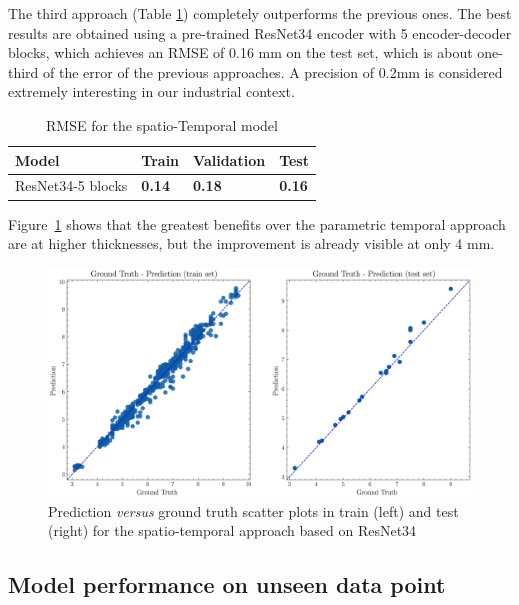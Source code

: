 The third approach (Table \ref{tab:spatial_temporal_model_results}) completely outperforms the previous ones. The best results are obtained using a pre-trained ResNet34 encoder with 5 encoder-decoder blocks, which achieves an RMSE of 0.16 mm on the test set, which is about one-third of the error of the previous approaches. A precision of 0.2mm is considered extremely interesting in our industrial context. 
\begin{table}
    \centering
    \caption{RMSE for the spatio-Temporal model}
    \begin{tabular}{llll}
    \toprule
    \textbf{Model} & \textbf{Train}  & \textbf{Validation}  & \textbf{Test}  \\
    \midrule
    ResNet34-5 blocks & \textbf{0.14} & \textbf{0.18} & \textbf{0.16} \\
    \bottomrule
    \end{tabular}
    \label{tab:spatial_temporal_model_results}
\end{table}
Figure~\ref{fig:gt_prediction_spatial_temporal} shows that the greatest benefits over the parametric temporal approach are at higher thicknesses, but the improvement is already visible at only 4 mm.

\begin{figure}
\centering
\includegraphics[scale=0.48]{images/chapter_4/gt_spatial_temporal.eps}
\caption{Prediction \textit{versus} ground truth scatter plots in train (left) and test (right) for the spatio-temporal approach based on ResNet34}
\label{fig:gt_prediction_spatial_temporal}
\end{figure}

\subsection{Model performance on unseen data point}

